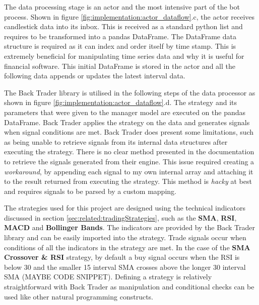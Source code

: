 The data processing stage is an actor and the most intensive part of the bot process. Shown in figure \ref{fig:implementation:actor_dataflow}.c, the actor receives candlestick data into its inbox. This is received as a standard python list and requires to be transformed into a pandas DataFrame. The DataFrame data structure is required as it can index and order itself by time stamp. This is extremely beneficial for manipulating time series data and why it is useful for financial software. This initial DataFrame is stored in the actor and all the following data appends or updates the latest interval data. 

The Back Trader library is utilised in the following steps of the data processor as shown in figure \ref{fig:implementation:actor_dataflow}.d. The strategy and its parameters that were given to the manager model are executed on the pandas DataFrame. Back Trader applies the strategy on the data and generates signals when signal conditions are met. Back Trader does present some limitations, such as being unable to retrieve signals from its internal data structures after executing the strategy. There is no clear method presented in the documentation to retrieve the signals generated from their engine. This issue required creating a \textit{workaround}, by appending each signal to my own internal array and attaching it to the result returned from executing the strategy. This method is \textit{hacky} at best and requires signals to be parsed by a custom mapping.

The strategies used for this project are designed using the technical indicators discussed in section \ref{sec:related:tradingStrategies}, such as the \textbf{SMA}, \textbf{RSI}, \textbf{MACD} and \textbf{Bollinger Bands}. The indicators are provided by the Back Trader library and can be easily imported into the strategy. Trade signals occur when conditions of all the indicators in the strategy are met. In the case of the \textbf{SMA Crossover \& RSI} strategy, by default a buy signal occurs when the RSI is below 30 and the smaller 15 interval SMA crosses above the longer 30 interval SMA (MAYBE CODE SNIPPET). Defining a strategy is relatively straightforward with Back Trader as manipulation and conditional checks can be used like other natural programming constructs.


